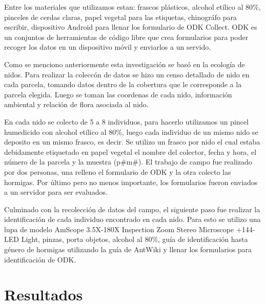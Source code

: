 \documentclass[11pt,]{article}
\begin{document}
Entre los materiales que utilizamos estan: frascos plásticos, alcohol
etílico al 80\%, pinceles de cerdas claras, papel vegetal para las
etiquetas, chinográfo para escribir, dispositivo Android para llenar los
formulario de ODK Collect. ODK es un conjuntos de herramientas de código
libre que crea formularios para poder recoger los datos en un
dispositivo móvil y enviarlos a un servido.

Como se menciono anteriormente esta investigación se basó en la ecología
de nidos. Para realizar la coleccón de datos se hizo un censo detallado
de nido en cada parcela, tomando datos dentro de la cobertura que le
corresponde a la parcela elegida. Luego se toman las coordenas de cada
nido, información ambiental y relación de flora asociada al nido.

En cada nido se colecto de 5 a 8 individuos, para hacerlo utilizamos un
pincel humedicido con alcohol etílico al 80\%, luego cada individuo de
un mismo nido se deposito en un mismo frasco, es decir. Se utilizo un
frasco por nido el cual estaba debidamente etiquetado en papel vegetal
el nombre del colector, fecha y hora, el número de la parcela y la
muestra (p\#m\#). El trabajo de campo fue realizado por dos personas,
una relleno el formulario de ODK y la otra colecto las hormigas. Por
último pero no menos importante, los formularios fueron enviados a un
servidor para ser evaluados.

Culminado con la recolección de datos del campo, el siguiente paso fue
realizar la identificación de cada individuo encontrado en cada nido.
Para esto se utilizo una lupa de modelo AmScope 3.5X-180X Inspection
Zoom Stereo Microscope +144-LED Light, pinzas, porta objetos, alcohol al
80\%, guía de identificación hasta género de hormigas utilizando la guía
de AntWiki y llenar los formularios para identificación de ODK.

\section{Resultados}\label{resultados}
\end{document}
